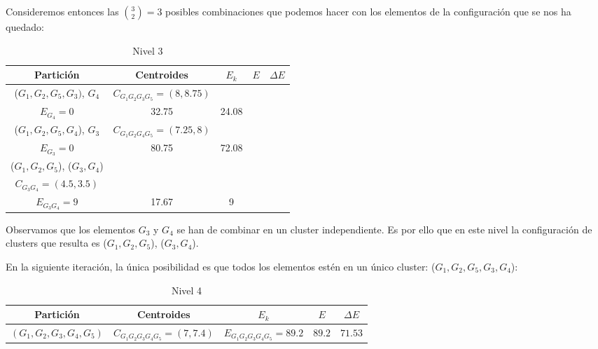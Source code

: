 \begin{ejemplo}
    Consideremos entonces las $\binom{3}{2} = 3$ posibles combinaciones que podemos hacer con los elementos de la configuración que se nos ha quedado:

    \begin{table}[h]
        \centering
        \begin{tabular}{|c|c|c|c|c|}
            \hline
            \textbf{Partición} & \textbf{Centroides} & \textbf{$E_k$} & \textbf{$E$} & \textbf{$\Delta E$} \\
            \hline
            ($G_{1},G_{2}, G_{5},G_{3})$, $G_{4}$ & $C_{G_{1}G_{2}G_{3}G_{5}} = (8,8.75)$ & \makecell{$E_{G_{1}G_{2}G_{3}G_{5}} = 32.75$ \\ $E_{G_{4}}=0$} & 32.75 & 24.08 \\
            \hline
            ($G_{1},G_{2}, G_{5},G_{4}$), $G_{3}$ & $C_{G_{1}G_{2}G_{4}G_{5}} = (7.25,8)$ & \makecell{$E_{G_{1}G_{2}G_{4}G_{5}} = 80.75$ \\ $E_{G_{3}}=0$} & 80.75 & 72.08 \\
            \hline
            ($G_{1},G_{2}, G_{5}$), ($G_{3}, G_{4}$) & \makecell{$C_{G_{1}G_{2}G_{5}} = (8.67,10)$ \\ $C_{G_{3}G_{4}} = (4.5,3.5)$} & \makecell{$E_{G_{1}G_{2}G_{5}} = 8.67$ \\ $E_{G_{3}G_{4}}=9$} & 17.67 & 9 \\
            \hline
            
        \end{tabular}
        \caption{Nivel 3}
    \end{table}

    Observamos que los elementos $G_{3}$ y $G_{4}$ se han de combinar en un cluster independiente. Es por ello que en este nivel la configuración de clusters que resulta es ($G_{1},G_{2}, G_{5}$), ($G_{3}, G_{4}$).\newline

    En la siguiente iteración, la única posibilidad es que todos los elementos estén en un único cluster: ($G_{1},G_{2}, G_{5},G_{3}, G_{4}$):

    \begin{table}[h]
        \centering
        \begin{tabular}{|c|c|c|c|c|}
            \hline
            \textbf{Partición} & \textbf{Centroides} & \textbf{$E_{k}$} & \textbf{$E$} & \textbf{$\Delta E$} \\
            \hline
            $(G_{1},G_{2},G_{3},G_{4},G_{5})$ & $C_{G_{1}G_{2}G_{3}G_{4}G_{5}}=(7,7.4)$ & $E_{G_{1}G_{2}G_{3}G_{4}G_{5}}=89.2$ & $89.2$ & $ 71.53$ \\
            \hline
        \end{tabular}
        \caption{Nivel 4} 


\end{table}
\end{ejemplo}
